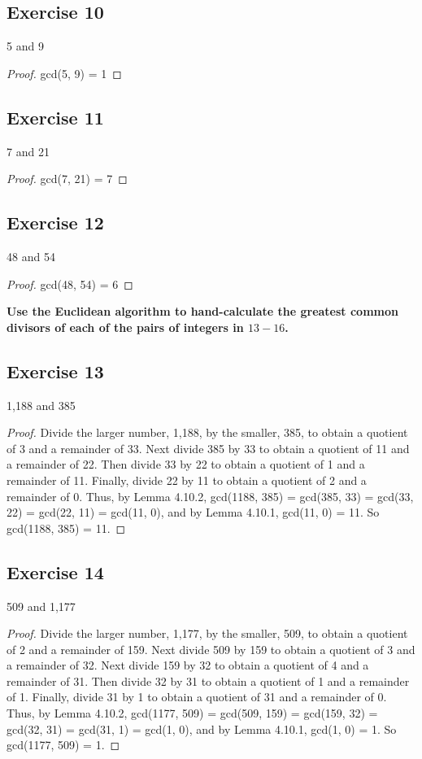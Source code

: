 \documentclass[14pt]{extarticle}
\newcommand{\cy}{\color{cyan}}
\begin{document}
\subsection{Exercise 10}
5 and 9

\begin{proof}
gcd(5, 9) = 1
\end{proof}

\subsection{Exercise 11}
7 and 21

\begin{proof}
gcd(7, 21) = 7
\end{proof}

\subsection{Exercise 12}
48 and 54

\begin{proof}
gcd(48, 54) = 6
\end{proof}

{\bf \cy Use the Euclidean algorithm to hand-calculate the greatest common divisors of each of the pairs of integers in $13-16$.}

\subsection{Exercise 13}
1,188 and 385

\begin{proof}
Divide the larger number, 1,188, by the smaller, 385, to obtain a quotient of 3 and a remainder of 33. Next divide 385 by 33 to obtain a quotient of 11 and a remainder of 22. Then divide 33 by 22 to obtain a quotient of 1 and a remainder of 11. Finally, divide 22 by 11 to obtain a quotient of 2 and a remainder of 0. Thus, by Lemma 4.10.2, gcd(1188, 385) = gcd(385, 33) = gcd(33, 22) = gcd(22, 11) = gcd(11, 0), and by Lemma 4.10.1, gcd(11, 0) = 11. So gcd(1188, 385) = 11.
\end{proof}

\subsection{Exercise 14}
509 and 1,177

\begin{proof}
Divide the larger number, 1,177, by the smaller, 509, to obtain a quotient of 2 and a remainder of 159. Next divide 509 by 159 to obtain a quotient of 3 and a remainder of 32. Next divide 159 by 32 to obtain a quotient of 4 and a remainder of 31. Then divide 32 by 31 to obtain a quotient of 1 and a remainder of 1. Finally, divide 31 by 1 to obtain a quotient of 31 and a remainder of 0. Thus, by Lemma 4.10.2, gcd(1177, 509) = gcd(509, 159) = gcd(159, 32) = gcd(32, 31) = gcd(31, 1) = gcd(1, 0), and by Lemma 4.10.1, gcd(1, 0) = 1. So gcd(1177, 509) = 1.
\end{proof}
\end{document}
